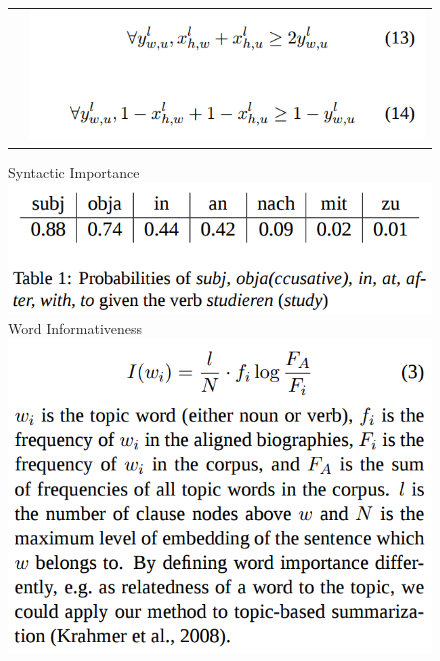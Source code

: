 \documentclass[xcolor={table}]{beamer}
\begin{document}
\begin{frame}[t]{\cite{filippova2008sentence}}
\begin{figure}[h]
\begin{tabular}{l l}
                                 &  \includegraphics[scale=.23]{images/con3-filippova08.png} \\
          \end{tabular}
  \end{figure}
\end{frame}

\begin{frame}[t]{\cite{filippova2008sentence}}
      \begin{figure}[h]
          \centering
          Syntactic Importance \\
      \includegraphics[scale=.25]{images/table1-filippova08.png} \\
      Word Informativeness \\
      \includegraphics[scale=.25]{images/inf-filippova08.png} \\
  \end{figure}
\end{frame}
\end{document}
